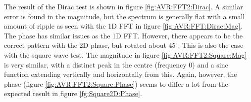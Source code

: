 The result of the Dirac test is shown in figure \ref{fig:AVR:FFT2:Dirac}. A similar error is found in the magnitude, but the spectrum is generally flat with a small amount of ripple as seen with the 1D FFT in figure \ref{fig:AVR:FFT:Dirac:Mag}. The phase has similar issues as the 1D FFT. However, there appears to be the correct pattern with the 2D phase, but rotated about $45^{\circ}$. This is also the case with the square wave test. The magnitude in figure \ref{fig:AVR:FFT2:Square:Mag} is very similar, with a distinct peak in the centre (frequency 0) and a sinc function extending vertically and horizontally from this. Again, however, the phase (figure \ref{fig:AVR:FFT2:Square:Phase}) seems to differ a lot from the expected result in figure \ref{fg:Square2D:Phase}. 
\begin{figure}

\end{figure}
